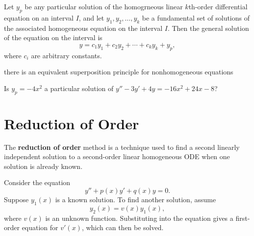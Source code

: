 \begin{theorem}
   Let \(y_p\) be any particular solution of the homogrneous linear \(k\)th-order differential equation on an interval \(I\), and
   let \(y_1,y_2,\ldots,y_k\) be a fundamental set of solutions of the associated homogeneous equation on the interval \(I\).
   Then the general solution of the equation on the interval is
   \[
   y = c_1y_1 + c_2y_2 + \cdots + c_ky_k + y_p,
   \]
   where \(c_i\) are arbitrary constants.
\end{theorem}

 there is an equivalent superposition principle for nonhomogeneous equations


\begin{example}
  Is \(y_p = -4x^2\) a particular solution of \(y'' - 3y' + 4y = -16x^2 + 24x - 8\)?
\end{example}






\section{Reduction of Order}
The \textbf{reduction of order} method is a technique used to find a 
second linearly independent solution to a second-order linear homogeneous ODE when one solution is already known.

Consider the equation
\[
y'' + p(x)y' + q(x)y = 0.
\]
Suppose $y_1(x)$ is a known solution. To find another solution, assume
\[
y_2(x) = v(x)y_1(x),
\]
where $v(x)$ is an unknown function. Substituting into the equation gives a first-order equation for $v'(x)$, which can then be solved.



